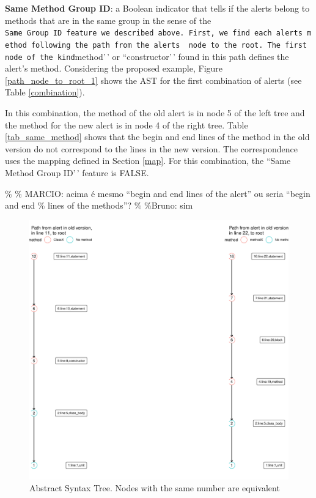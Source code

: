 \documentclass[
]{article}
\begin{document}
\normalsize

\noindent \textbf{Same Method Group ID}: a Boolean indicator that tells
if the alerts belong to methods that are in the same group in the sense
of the
\texttt{Same\ Group\ ID\textquotesingle{}\textquotesingle{}\ feature\ we\ described\ above.\ First,\ we\ find\ each\ alert\textquotesingle{}s\ method\ following\ the\ path\ from\ the\ alert\textquotesingle{}s\ \ node\ to\ the\ root.\ The\ first\ node\ of\ the\ kind}method'\,'
or ``constructor'\,' found in this path defines the alert's method.
Considering the proposed example, Figure \ref{path_node_to_root_1} shows
the AST for the first combination of alerts (see Table
\ref{combination}).

In this combination, the method of the old alert is in node 5 of the
left tree and the method for the new alert is in node 4 of the right
tree. Table \ref{tab_same_method} shows that the begin and end lines of
the method in the old version do not correspond to the lines in the new
version. The correspondence uses the mapping defined in Section
\ref{map}. For this combination, the ``Same Method Group ID'\,' feature
is FALSE.

\% \% MARCIO: acima é mesmo ``begin and end lines of the alert'' ou
seria ``begin and end \% lines of the methods''? \% \%Bruno: sim

\small

\begin{figure}[H]
\includegraphics[width=1\linewidth]{report_files/figure-latex/unnamed-chunk-8-1} \caption{Abstract Syntax Tree. Nodes with the same number are equivalent \label{path_node_to_root_1}}\label{fig:unnamed-chunk-8}
\end{figure}
\end{document}
